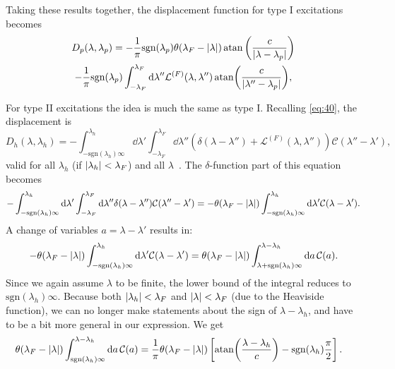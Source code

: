 \documentclass[11pt, a4paper]{report} %
\begin{document}
Taking these results together, the displacement function for type I excitations becomes 
\begin{multline}
	D_p(\lambda, \lambda_p) = - \frac{1}{\pi} \textrm{sgn}(\lambda_p) \theta(\lambda_F - \abs{\lambda})  \atan\left(\frac{c}{\abs{\lambda-\lambda_p}}\right) \\-\frac{1}{\pi}\textrm{sgn}(\lambda_p) \int_{-\lambda_F}^{\lambda_F} \dd \lambda''   \mathcal{L}^{(F)}(\lambda,\lambda'') \atan(\frac{c}{\abs{\lambda''-\lambda_p}}),
\end{multline}

For type II excitations the idea is much the same as type I. Recalling \cref{eq:40}, the displacement is
\begin{equation}
	D_h(\lambda, \lambda_h) = - \int_{-\textrm{sgn}(\lambda_h)\infty}^{\lambda_h} \dd \lambda' \int_{-\lambda_F}^{\lambda_F} \dd \lambda'' \left(\delta(\lambda-\lambda'') + \mathcal{L}^{(F)}(\lambda,\lambda'') \right)\mathcal{C}(\lambda''-\lambda'),
\end{equation}
valid for all \(\lambda_h\) (if \(\abs{\lambda_h} < \lambda_F\)) and all \(\lambda\)~\cite{Caux2015}.
The \(\delta\)-function part of this equation becomes
\begin{align}
	-\int_{-\textrm{sgn}(\lambda_h)\infty}^{\lambda_h} \dd \lambda' \int_{-\lambda_F}^{\lambda_F} \dd \lambda'' \delta(\lambda-\lambda'') \mathcal{C}(\lambda''-\lambda') 
		= - \theta(\lambda_F - \abs{\lambda}) \int_{-\textrm{sgn}(\lambda_h)\infty}^{\lambda_h} \dd \lambda'     \mathcal{C}(\lambda-\lambda').
\end{align}
A change of variables \(a=\lambda-\lambda'\) results in:
\begin{align}
	 - \theta(\lambda_F - \abs{\lambda}) \int_{-\textrm{sgn}(\lambda_h)\infty}^{\lambda_h} \dd \lambda'     \mathcal{C}(\lambda-\lambda') = 
	  \theta(\lambda_F - \abs{\lambda}) \int_{\lambda+\textrm{sgn}(\lambda_h)\infty}^{\lambda-\lambda_h} \dd a \, \mathcal{C}(a).
\end{align}
Since we again assume \(\lambda\) to be finite, the lower bound of the integral reduces to \(\textrm{sgn}(\lambda_h)\infty\).
Because both \({\abs{\lambda_h} < \lambda_F}\) and \({\abs{\lambda} < \lambda_F}\) (due to the Heaviside function), we can no longer make statements about the sign of \(\lambda-\lambda_h\), and have to be a bit more general in our expression.
We get
\begin{align}
	  \theta(\lambda_F - \abs{\lambda}) \int_{\textrm{sgn}(\lambda_h)\infty}^{\lambda-\lambda_h} \dd a \, \mathcal{C}(a) 
	  &= \frac{1}{\pi}\theta(\lambda_F - \abs{\lambda}) \left[ \atan(\frac{\lambda-\lambda_h}{c}) - \textrm{sgn}(\lambda_h)\frac{\pi}{2}\right].
\end{align}
\end{document}
